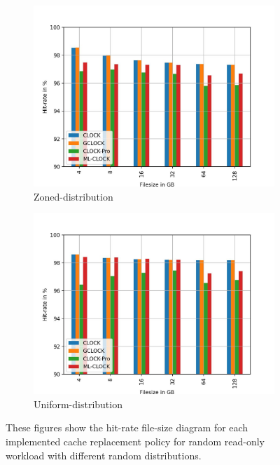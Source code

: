 \documentclass[
	12pt,
	a4paper,
	abstract,
	bibliography=totoc,
	chapterprefix,
	headings=openright,
	numbers=endperiod,
	parskip=half,
	twoside,
]{scrreprt}
\begin{document}
\begin{figure}[H]
\begin{subfigure}{0.4\textwidth}
		\includegraphics[width=\textwidth]{randread_zoned.jpg}		
		\caption{Zoned-distribution}
		\label{fig:randread zoned}
	\end{subfigure}
	\hfill
	\begin{subfigure}{0.4\textwidth}
		\includegraphics[width=\textwidth]{randread_uniform.jpg}		
		\caption{Uniform-distribution}
		\label{fig:randread uniform}
	\end{subfigure}
	\caption{These figures show the hit-rate file-size diagram for each implemented cache replacement policy for random read-only workload with different 				random distributions.}
	\label{fig:single 100p read}
\end{figure}
\end{document}
